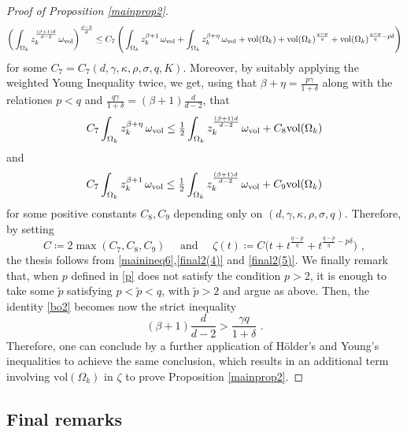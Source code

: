 \documentclass[10pt, a4paper, reqno, oneside]{amsart}
\theoremstyle{plain}
\theoremstyle{definition}
\theoremstyle{plain}
\theoremstyle{definition}
\theoremstyle{plain}
\renewcommand{\=}{:=}
\begin{document}
\begin{proof}[Proof of Proposition \ref{mainprop2}]
\begin{equation}
\bigg(\int_{\Omega_k} z_k^{\frac{(\beta+1)d}{d-2}}\, \omega_{\mathrm{vol}}\bigg)^{\frac{d-2}d} \leq
C_7\, \Bigg(
\int_{\Omega_k} z_k^{\beta+1}\, \omega_{\mathrm{vol}}
+\int_{\Omega_k}z_k^{\beta+\eta}\, \omega_{\mathrm{vol}}
+{\rm vol}(\Omega_k)
+{\rm vol}(\Omega_k)^{\frac{q-p}{q}}
+{\rm vol}(\Omega_k)^{\frac{q-p}{q} -p\delta}
\Bigg)
\end{equation}
for some $C_7=C_7(d,\gamma,\kappa,\rho,\sigma,q,K)$. Moreover, by suitably applying the weighted Young Inequality twice, we get, using that $\beta+\eta=\frac{p\gamma}{1+\delta}$ along with the relationes $p<q$ and $\frac{q\gamma}{1+\delta}=(\beta+1)\frac{d}{d-2}$, that
\begin{equation} \label{final2(4)}
C_7\int_{\Omega_k} z_k^{\beta+\eta}\, \omega_{\mathrm{vol}} \leq \tfrac12 \int_{\Omega_k} z_k^{\frac{(\beta+1)d}{d-2}}\, \omega_{\mathrm{vol}}
+C_8 {\rm vol}(\Omega_k)
\end{equation}
and
\begin{equation} \label{final2(5)}
C_7\int_{\Omega_k} z_k^{\beta+1}\, \omega_{\mathrm{vol}}\leq
\tfrac12 \int_{\Omega_k} z_k^{\frac{(\beta+1)d}{d-2}}\, \omega_{\mathrm{vol}}
+C_9 {\rm vol}(\Omega_k)
\end{equation}
for some positive constants $C_8,C_9$ depending only on $(d,\gamma,\kappa,\rho,\sigma,q)$. Therefore, by setting
$$
C \coloneqq 2\max{(C_7,C_8,C_9)} \quad \text{ and } \quad
\zeta(t) \coloneqq C\big(t +t^{\frac{q-p}{q}} +t^{\frac{q-p}{q} -p\delta}\big) \,\, ,
$$
the thesis follows from \eqref{mainineq6},\eqref{final2(4)} and \eqref{final2(5)}. We finally remark that, when $p$ defined in \eqref{p} does not satisfy the condition $p>2$, it is enough to take some $\tilde p$ satisfying $p<\tilde p<q$, with $\tilde p>2$ and argue as above. Then, the identity \eqref{bo2} becomes now the strict inequality
$$
(\beta+1)\frac{d}{d-2}>\frac{\gamma q}{1+\delta} \,\, .
$$
Therefore, one can conclude by a further application of H\"older's and Young's inequalities to achieve the same conclusion, which results in an additional term involving $\mathrm{vol}(\Omega_k)$ in $\zeta$ to prove Proposition \ref{mainprop2}.
\end{proof}


\subsection{Final remarks}
\end{document}

